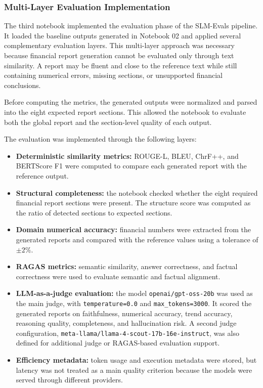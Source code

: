     \subsubsection{Multi-Layer Evaluation Implementation}
    The third notebook implemented the evaluation phase of the SLM-Evals pipeline. It loaded the baseline outputs generated in Notebook 02 and applied several complementary evaluation layers. This multi-layer approach was necessary because financial report generation cannot be evaluated only through text similarity. A report may be fluent and close to the reference text while still containing numerical errors, missing sections, or unsupported financial conclusions.

Before computing the metrics, the generated outputs were normalized and parsed into the eight expected report sections. This allowed the notebook to evaluate both the global report and the section-level quality of each output.
    
The evaluation was implemented through the following layers:

\begin{itemize}
    \item \textbf{Deterministic similarity metrics:} ROUGE-L, BLEU, ChrF++, and BERTScore F1 were computed to compare each generated report with the reference output.
    
    \item \textbf{Structural completeness:} the notebook checked whether the eight required financial report sections were present. The structure score was computed as the ratio of detected sections to expected sections.
    
    \item \textbf{Domain numerical accuracy:} financial numbers were extracted from the generated reports and compared with the reference values using a tolerance of $\pm 2\%$.
    
    \item \textbf{RAGAS metrics:} semantic similarity, answer correctness, and factual correctness were used to evaluate semantic and factual alignment.
    
    \item \textbf{LLM-as-a-judge evaluation:} the model \texttt{openai/gpt-oss-20b} was used as the main judge, with \texttt{temperature=0.0} and \texttt{max\_tokens=3000}. It scored the generated reports on faithfulness, numerical accuracy, trend accuracy, reasoning quality, completeness, and hallucination risk. A second judge configuration, \texttt{meta-llama/llama-4-scout-17b-16e-instruct}, was also defined for additional judge or RAGAS-based evaluation support.    
    
    \item \textbf{Efficiency metadata:} token usage and execution metadata were stored, but latency was not treated as a main quality criterion because the models were served through different providers.
\end{itemize}

